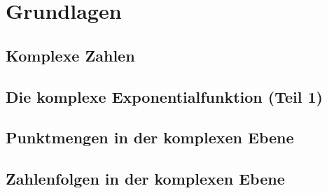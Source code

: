 \section{Grundlagen}

\subsection{Komplexe Zahlen}

\subsection{Die komplexe Exponentialfunktion (Teil 1)}

\subsection{Punktmengen in der komplexen Ebene}

\subsection{Zahlenfolgen in der komplexen Ebene}
